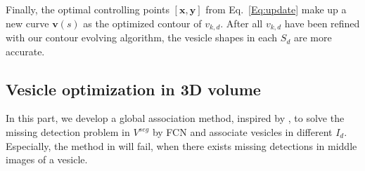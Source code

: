 Finally, the optimal controlling points $[\mathbf{x},\mathbf{y}]$ from Eq.~\ref{Eq:update} make up a new curve $\mathbf{v}(s)$ as the optimized contour of $v_{k,d}$. 
After all $v_{k,d}$ have been refined with our contour evolving algorithm, the vesicle shapes in each $S_d$ are more accurate.

\subsection{ Vesicle optimization in 3D volume}
In this part, we develop a global association method, inspired by \cite{Xu2016,Zhang2008}, to solve the missing detection problem in $V^{seg}$ by FCN and associate vesicles in different $I_d$.
Especially, the method in \cite{Xu2016} will fail, when there exists missing detections in middle images of a vesicle.

